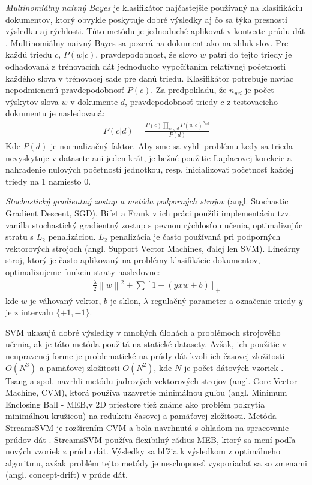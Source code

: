\textit{Multinomiálny naivný Bayes} je klasifikátor najčastejšie používaný na klasifikáciu dokumentov, ktorý obvykle poskytuje dobré výsledky aj čo sa týka presnosti výsledku aj rýchlosti. Túto metódu je jednoduché aplikovať v kontexte prúdu dát \citep{bifet2010sentiment}. Multinomiálny naivný Bayes sa pozerá na dokument ako na zhluk slov. Pre každú triedu $c$, $P(w|c)$, pravdepodobnosť, že slovo $w$ patrí do tejto triedy je odhadovaná z trénovacích dát jednoducho vypočítaním relatívnej početnosti každého slova v trénovacej sade pre danú triedu. Klasifikátor potrebuje naviac nepodmienenú pravdepodobnosť $P(c)$. Za predpokladu, že $\displaystyle n_{wd}$ je počet výskytov slova $w$ v dokumente $d$, pravdepodobnosť triedy $c$ z testovacieho dokumentu je nasledovaná: \newline
\begin{align*}
P(c|d) = \frac{P(c)\prod _{w \in d} P(w|c)^{n_{wd}}} {P(d)}
\end{align*}
Kde $P(d)$ je normalizačný faktor. Aby sme sa vyhli problému kedy sa trieda nevyskytuje v datasete ani jeden krát, je bežné použitie Laplacovej korekcie a nahradenie nulových početností jednotkou, resp. inicializovať početnosť každej triedy na 1 namiesto 0.

\textit{Stochastický gradientný zostup a metóda podporných strojov} (angl. Stochastic Gradient Descent, SGD). Bifet a Frank v ich práci použili implementáciu tzv. vanilla stochastický gradientný zostup s pevnou rýchlosťou učenia, optimalizujúc stratu s $L_2$ penalizáciou. $L_2$ penalizácia je často používaná pri podporných vektorových strojoch (angl. Support Vector Machines, ďalej len SVM). Lineárny stroj, ktorý je často aplikovaný na problémy klasifikácie dokumentov, optimalizujeme funkciu straty nasledovne:
\begin{align*}
\frac{\lambda }{2}\left \| w \right \|^{2}+\sum [1-(yxw + b)]_{+}
\end{align*}
kde $w$ je váhovaný vektor, $b$ je sklon, $\lambda$ regulačný parameter a označenie triedy $y$ je z intervalu $\{+1, -1\}$.
\par
SVM ukazujú dobré výsledky v mnohých úlohách a problémoch strojového učenia, ak je táto metóda použitá na statické datasety. Avšak, ich použitie v neupravenej forme je problematické na prúdy dát kvoli ich časovej zložitosti $O(N^3)$ a pamäťovej zložitosti $O(N^2)$, kde $N$ je počet dátových vzoriek \citep{nguyen2015survey}. Tsang a spol. navrhli metódu jadrových vektorových strojov (angl. Core Vector Machine, CVM), ktorá používa uzavretie minimálnou guľou (angl. Minimum Enclosing Ball - MEB,v 2D priestore tiež známe ako problém pokrytia minimálnou kružicou) na redukciu časovej a pamäťovej zložitosti. Metóda StreamsSVM je rozšírením CVM a bola navrhnutá s ohľadom na spracovanie prúdov dát \citep{rai2009streamed}. StreamsSVM používa flexibilný rádius MEB, ktorý sa mení podľa nových vzoriek z prúdu dát. Výsledky sa blížia k výsledkom z optimálneho algoritmu, avšak problém tejto metódy je neschopnosť vysporiadať sa so zmenami (angl. concept-drift) v prúde dát.


